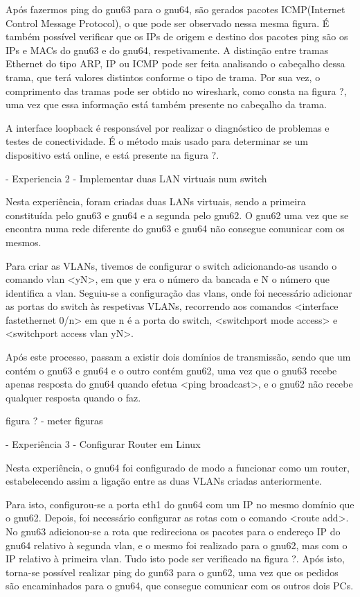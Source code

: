 \documentclass[article, a4paper, 11pt, oneside]{memoir}
\begin{document}
Após fazermos ping do gnu63 para o gnu64, são gerados pacotes ICMP(Internet Control Message Protocol), o que pode ser observado nessa mesma figura.
É também possível verificar que os IPs de origem e destino dos pacotes ping são os IPs e MACs do gnu63 e do gnu64, respetivamente.
A distinção entre tramas Ethernet do tipo ARP, IP ou ICMP pode ser feita analisando o cabeçalho dessa trama, que terá valores distintos conforme o tipo de trama.
Por sua vez, o comprimento das tramas pode ser obtido no wireshark, como consta na figura ?, uma vez que essa informação está também presente no cabeçalho da trama.

A interface loopback é responsável por realizar o diagnóstico de problemas e testes de conectividade.
É o método mais usado para determinar se um dispositivo está online, e está presente na figura ?.

- Experiencia 2 - Implementar duas LAN virtuais num switch

Nesta experiência, foram criadas duas LANs virtuais, sendo a primeira constituída pelo gnu63 e gnu64 e a segunda pelo gnu62.
O gnu62 uma vez que se encontra numa rede diferente do gnu63 e gnu64 não consegue comunicar com os mesmos.

Para criar as VLANs, tivemos de configurar o switch adicionando-as usando o comando vlan <yN>, em que y era o número da bancada e N o número que identifica a vlan. Seguiu-se a configuração das vlans,
onde foi necessário adicionar as portas do switch às respetivas VLANs, recorrendo aos comandos <interface fastethernet 0/n> em que n é a porta do switch, <switchport mode access> e <switchport access vlan yN>.

Após este processo, passam a existir dois domínios de transmissão, sendo que um contém o gnu63 e gnu64 e o outro contém gnu62,
uma vez que o gnu63 recebe apenas resposta do gnu64 quando efetua <ping broadcast>, e o gnu62 não recebe qualquer resposta quando o faz.

figura ? - meter figuras

- Experiência 3 - Configurar Router em Linux

Nesta experiência, o gnu64 foi configurado de modo a funcionar como um router, estabelecendo assim a ligação entre as duas VLANs criadas anteriormente.

Para isto, configurou-se a porta eth1 do gnu64 com um IP no mesmo domínio que o gnu62. Depois, foi necessário configurar as rotas com o comando <route add>. No gnu63 adicionou-se a rota
que redireciona os pacotes para o endereço IP do gnu64 relativo à segunda vlan, e o mesmo foi realizado para o gnu62, mas com o IP relativo à primeira vlan.
Tudo isto pode ser verificado na figura ?.
Após isto, torna-se possível realizar ping do gun63 para o gun62, uma vez que os pedidos são encaminhados para o gnu64, que consegue comunicar com os outros dois PCs.
\end{document}
